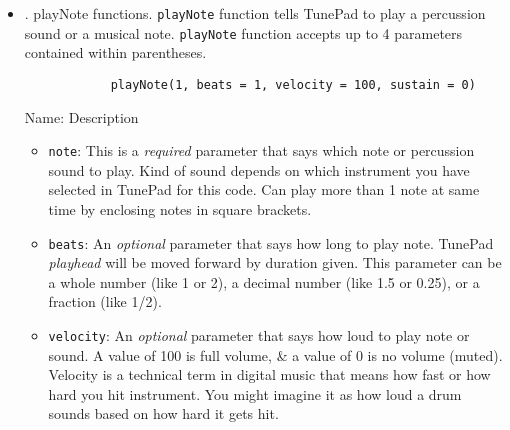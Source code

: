 \documentclass{article}
\begin{document}
\begin{itemize}
\begin{itemize}
		1st, have to write name of function. Functions have 1-word names (with no spaces) that can consist of letters, numbers, \& underscore \verb|_| character. Multi-word functions will either use underscore character between words as in \verb|my_multi_word_function()| or each new word will be capitalized as in {\tt playNote()}.
		
		2nd, after type name of function, have to include parentheses. Parentheses tell Python that you're calling a function.
		
		3rd, include any {\it parameters} that you want to {\it pass} to function in between left \& right parentheses. A parameter provides extra information or tells function how to behave. E.g., {\tt playNote} statement needs at least 1 parameter to tell it which note or sound to play. Sometimes functions accept multiple parameters (some of which can be optional). {\tt playNote} function accepts several optional parameters described in next sect. Each additional parameter is separated with a comma ({\sf Fig. 2.10: Calling {\tt playNote} function in TunePad with 2 parameters inside parentheses.})
		\item {. playNote functions.} {\tt playNote} function tells TunePad to play a percussion sound or a musical note. {\tt playNote} function accepts up to 4 parameters contained within parentheses.
		\begin{verbatim}
			playNote(1, beats = 1, velocity = 100, sustain = 0)
		\end{verbatim}
		{\sf Name: Description}
		\begin{itemize}
			\item {\tt note}: This is a {\it required} parameter that says which note or percussion sound to play. Kind of sound depends on which instrument you have selected in TunePad for this code. Can play more than 1 note at same time by enclosing notes in square brackets.
			\item {\tt beats}: An {\it optional} parameter that says how long to play note. TunePad {\it playhead} will be moved forward by duration given. This parameter can be a whole number (like 1 or 2), a decimal number (like 1.5 or 0.25), or a fraction (like 1/2).
			\item {\tt velocity}: An {\it optional} parameter that says how loud to play note or sound. A value of 100 is full volume, \& a value of 0 is no volume (muted). Velocity is a technical term in digital music that means how fast or how hard you hit instrument. You might imagine it as how loud a drum sounds based on how hard it gets hit.

\end{itemize}
\end{itemize}
\end{itemize}
\end{document}

